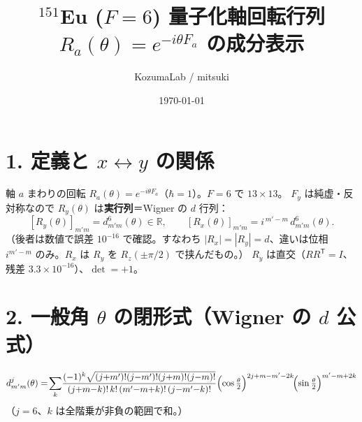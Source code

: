 \documentclass[a4paper,11pt]{ltjsarticle}
\title{$^{151}$Eu ($F=6$) 量子化軸回転行列 $R_a(\theta)=e^{-i\theta F_a}$ の成分表示}
\author{KozumaLab / mitsuki}
\date{\today}
\begin{document}
\maketitle

\section*{1. 定義と $x\leftrightarrow y$ の関係}
軸 $a$ まわりの回転 $R_a(\theta)=e^{-i\theta F_a}$（$\hbar=1$）。$F=6$ で $13\times13$。
$F_y$ は純虚・反対称なので $R_y(\theta)$ は\textbf{実行列}＝Wigner の $d$ 行列：
\[
[R_y(\theta)]_{m'm}=d^{6}_{m'm}(\theta)\in\mathbb{R},\qquad
[R_x(\theta)]_{m'm}=i^{\,m'-m}\,d^{6}_{m'm}(\theta).
\]
（後者は数値で誤差 $10^{-16}$ で確認。すなわち $|R_x|=|R_y|=d$、違いは位相 $i^{m'-m}$ のみ。$R_x$ は $R_y$ を $R_z(\pm\pi/2)$ で挟んだもの。）
$R_y$ は直交（$R R^{\mathsf T}=I$、残差 $3.3\times10^{-16}$）、$\det=+1$。

\section*{2. 一般角 $\theta$ の閉形式（Wigner の $d$ 公式）}
\[
d^{j}_{m'm}(\theta)=\!\sum_{k}\!\frac{(-1)^{k}\sqrt{(j{+}m')!(j{-}m')!(j{+}m)!(j{-}m)!}}
{(j{+}m{-}k)!\,k!\,(m'{-}m{+}k)!\,(j{-}m'{-}k)!}
\Bigl(\cos\tfrac\theta2\Bigr)^{2j+m-m'-2k}\!\Bigl(\sin\tfrac\theta2\Bigr)^{m'-m+2k}
\]
（$j=6$、$k$ は全階乗が非負の範囲で和。）
\end{document}
